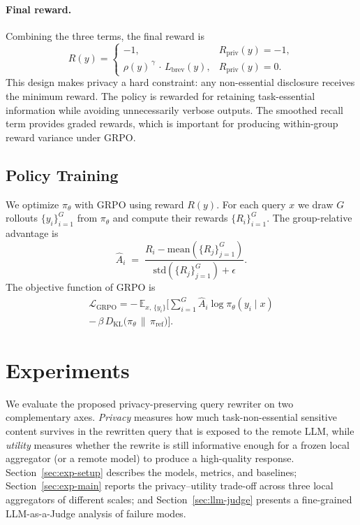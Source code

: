 \paragraph{Final reward.}
Combining the three terms, the final reward is
\begin{equation}
  R(y) =
  \begin{cases}
    -1, & R_{\text{priv}}(y) = -1, \\[4pt]
    \rho(y)^{\,\gamma}\,\cdot\,L_{\text{brev}}(y),
        & R_{\text{priv}}(y) = 0.
  \end{cases}
\end{equation}
This design makes privacy a hard constraint: any non-essential
disclosure receives the minimum reward. The policy is rewarded for
retaining task-essential information while avoiding unnecessarily
verbose outputs. The smoothed recall term provides graded rewards,
which is important for producing within-group reward variance under
GRPO.

\subsection{Policy Training}
\label{sec:policy}

We optimize $\pi_\theta$ with GRPO using reward $R(y)$. For each
query $x$ we draw $G$ rollouts $\{y_i\}_{i=1}^{G}$ from $\pi_\theta$
and compute their rewards $\{R_i\}_{i=1}^{G}$. The group-relative
advantage is
\begin{equation}
  \hat{A}_i \;=\;
  \frac{R_i - \mathrm{mean}(\{R_j\}_{j=1}^{G})}
       {\mathrm{std}(\{R_j\}_{j=1}^{G}) + \epsilon}.
\end{equation}
The objective function of GRPO is
\begin{equation}
\begin{aligned}
  \mathcal{L}_{\text{GRPO}}
  = -\,\mathbb{E}_{x,\,\{y_i\}}\Biggl[
      \sum_{i=1}^{G} \hat{A}_i \log \pi_\theta(y_i \mid x) \\
      -\,\beta\, D_{\mathrm{KL}}\!\bigl(\pi_\theta \,\|\, \pi_{\text{ref}}\bigr)
  \Biggr].
\end{aligned}
\end{equation}

\section{Experiments}
\label{sec:experiments}

We evaluate the proposed privacy-preserving query rewriter on two
complementary axes. \emph{Privacy} measures how much
task-non-essential sensitive content survives in the rewritten query
that is exposed to the remote LLM, while \emph{utility} measures
whether the rewrite is still informative enough for a frozen local
aggregator (or a remote model) to produce a high-quality response.
Section~\ref{sec:exp-setup} describes the models, metrics, and
baselines; Section~\ref{sec:exp-main} reports the privacy--utility
trade-off across three local aggregators of different scales; and
Section~\ref{sec:llm-judge} presents a fine-grained LLM-as-a-Judge
analysis of failure modes.

